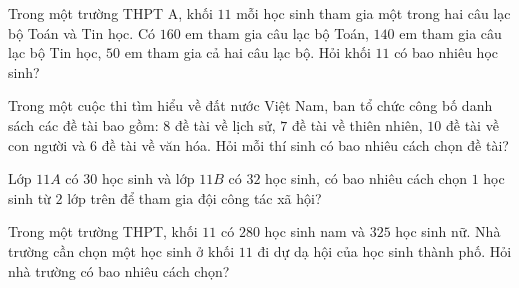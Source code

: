 \begin{bt}%
	Trong một trường THPT A, khối $11$ mỗi học sinh tham gia một trong hai câu lạc bộ Toán và Tin học. Có $160$ em tham gia câu lạc bộ Toán, $140$ em tham gia câu lạc bộ Tin học, $50$ em tham gia cả hai câu lạc bộ. Hỏi khối $11$ có bao nhiêu học sinh?
\end{bt}

\begin{bt}%
	Trong một cuộc thi tìm hiểu về đất nước Việt Nam, ban tổ chức công bố danh sách các đề tài bao gồm: $8$ đề tài về lịch sử, $7$ đề tài về thiên nhiên, $10$ đề tài về con người và $6$ đề tài về văn hóa. Hỏi mỗi thí sinh có bao nhiêu cách chọn đề tài? 
\end{bt}

\begin{bt}%
	Lớp $11A$ có $30$ học sinh và lớp $11B$ có $32$ học sinh, có bao nhiêu cách chọn $1$ học sinh từ $2$ lớp trên để tham gia đội công tác xã hội?  
\end{bt}

\begin{bt}%
	Trong một trường THPT, khối $11$ có $280$ học sinh nam và $325$ học sinh nữ. Nhà trường cần chọn một học sinh ở khối $11$ đi dự dạ hội của học sinh thành phố. Hỏi nhà trường có bao nhiêu cách chọn?  
\end{bt}

